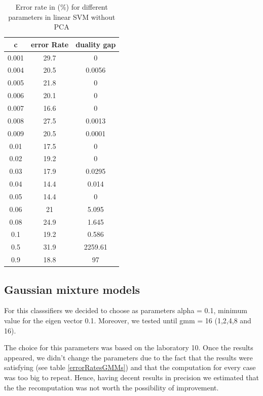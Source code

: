 \documentclass[twoside,a4paper,12pt]{report}
\begin{document}
\begin{table}[H]
    \centering
     \begin{tabular}{||c c c ||} 
        \hline \hline
            c& error Rate& duality gap \\
            \hline \hline
            0.001&29.7& 0 \\
            \hline
            0.004&20.5& 0.0056\\
            \hline
            0.005& 21.8& 0\\
            \hline
            0.006& 20.1& 0\\
            \hline
            0.007& 16.6& 0\\
            \hline
            0.008& 27.5& 0.0013\\
            \hline
            0.009& 20.5& 0.0001\\
            \hline
            0.01& 17.5& 0\\
            \hline
            0.02&19.2& 0\\
            \hline
            0.03& 17.9& 0.0295\\
            \hline
            0.04& \cellcolor{blue!25}14.4& 0.014\\
            \hline
            0.05& \cellcolor{blue!25}14.4& 0\\
            \hline
            0.06& 21& 5.095\\
            \hline
            0.08& 24.9& 1.645\\
            \hline
            0.1& 19.2& 0.586\\
            \hline
            0.5& 31.9& 2259.61\\
            \hline
            0.9& 18.8& 97\\
\hline \hline
    \end{tabular}
    \caption{Error rate in (\%) for different parameters in linear SVM without PCA \label{errorRatesLinearSVMNoPCA}}
\end{table}    






\subsection{Gaussian mixture models}
For this classsifiers we decided to choose as parameters alpha = 0.1, minimum value
for the eigen vector 0.1. Moreover, we tested until gmm = 16 (1,2,4,8 and 16).

The choice for this parameters was based on the laboratory 10. Once the results appeared,
we didn't change the parameters due to the fact that the results were satisfying (see table \ref{errorRatesGMMs})
and that the computation for every case was too big to repeat. Hence, having
decent results in precision we estimated that the the recomputation was not worth the 
possibility of improvement.
\end{document}
